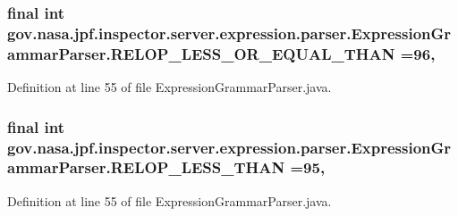\subsubsection[{\texorpdfstring{R\+E\+L\+O\+P\+\_\+\+L\+E\+S\+S\+\_\+\+O\+R\+\_\+\+E\+Q\+U\+A\+L\+\_\+\+T\+H\+AN}{RELOP_LESS_OR_EQUAL_THAN}}]{\setlength{\rightskip}{0pt plus 5cm}final int gov.\+nasa.\+jpf.\+inspector.\+server.\+expression.\+parser.\+Expression\+Grammar\+Parser.\+R\+E\+L\+O\+P\+\_\+\+L\+E\+S\+S\+\_\+\+O\+R\+\_\+\+E\+Q\+U\+A\+L\+\_\+\+T\+H\+AN =96\hspace{0.3cm}{\ttfamily [static]}, {\ttfamily [package]}}\hypertarget{classgov_1_1nasa_1_1jpf_1_1inspector_1_1server_1_1expression_1_1parser_1_1_expression_grammar_parser_abc6b4a692c2a82724b6df374917bb72c}{}\label{classgov_1_1nasa_1_1jpf_1_1inspector_1_1server_1_1expression_1_1parser_1_1_expression_grammar_parser_abc6b4a692c2a82724b6df374917bb72c}


Definition at line 55 of file Expression\+Grammar\+Parser.\+java.

\subsubsection[{\texorpdfstring{R\+E\+L\+O\+P\+\_\+\+L\+E\+S\+S\+\_\+\+T\+H\+AN}{RELOP_LESS_THAN}}]{\setlength{\rightskip}{0pt plus 5cm}final int gov.\+nasa.\+jpf.\+inspector.\+server.\+expression.\+parser.\+Expression\+Grammar\+Parser.\+R\+E\+L\+O\+P\+\_\+\+L\+E\+S\+S\+\_\+\+T\+H\+AN =95\hspace{0.3cm}{\ttfamily [static]}, {\ttfamily [package]}}\hypertarget{classgov_1_1nasa_1_1jpf_1_1inspector_1_1server_1_1expression_1_1parser_1_1_expression_grammar_parser_a81a2f58d063f0633a0d43a1a33e5c041}{}\label{classgov_1_1nasa_1_1jpf_1_1inspector_1_1server_1_1expression_1_1parser_1_1_expression_grammar_parser_a81a2f58d063f0633a0d43a1a33e5c041}


Definition at line 55 of file Expression\+Grammar\+Parser.\+java.

